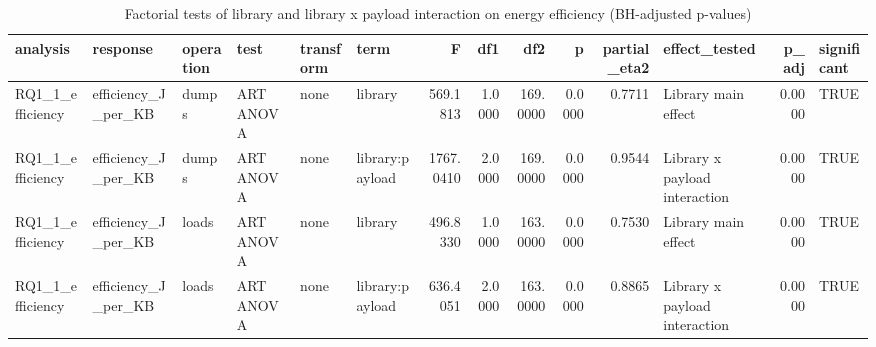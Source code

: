 \begin{table}[ht]
\centering
\begin{tabular}{llllllrrrrrlrl}
  \toprule
analysis & response & operation & test & transform & term & F & df1 & df2 & p & partial\_eta2 & effect\_tested & p\_adj & significant \\ 
  \midrule
RQ1\_1\_efficiency & efficiency\_J\_per\_KB & dumps & ART ANOVA & none & library & 569.1813 & 1.0000 & 169.0000 & 0.0000 & 0.7711 & Library main effect & 0.0000 & TRUE \\ 
  RQ1\_1\_efficiency & efficiency\_J\_per\_KB & dumps & ART ANOVA & none & library:payload & 1767.0410 & 2.0000 & 169.0000 & 0.0000 & 0.9544 & Library x payload interaction & 0.0000 & TRUE \\ 
  RQ1\_1\_efficiency & efficiency\_J\_per\_KB & loads & ART ANOVA & none & library & 496.8330 & 1.0000 & 163.0000 & 0.0000 & 0.7530 & Library main effect & 0.0000 & TRUE \\ 
  RQ1\_1\_efficiency & efficiency\_J\_per\_KB & loads & ART ANOVA & none & library:payload & 636.4051 & 2.0000 & 163.0000 & 0.0000 & 0.8865 & Library x payload interaction & 0.0000 & TRUE \\ 
   \bottomrule
\end{tabular}
\caption{Factorial tests of library and library x payload interaction on energy efficiency (BH-adjusted p-values)} 
\label{tab:RQ1_1_efficiency_anova}
\end{table}
